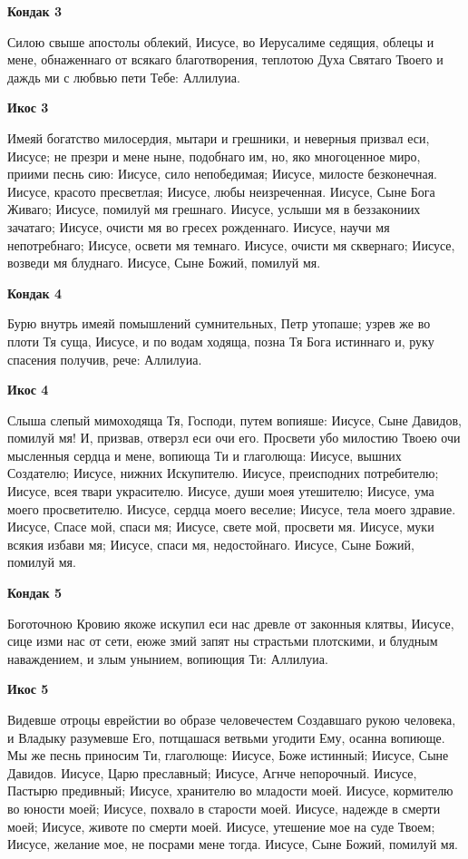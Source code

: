 \medskip
\bfseries Кондак 3\normalfont{}\nopagebreak


Силою
свыше апостолы облекий, Иисусе, во Иерусалиме седящия, облецы и мене, обнаженнаго от всякаго благотворения, теплотою Духа Святаго Твоего и даждь ми с любвью пети Тебе: Аллилуиа.


\medskip
\bfseries Икос 3\normalfont{}\nopagebreak


Имеяй
богатство милосердия, мытари и грешники, и неверныя призвал еси, Иисусе; не презри и мене ныне, подобнаго им, но, яко многоценное миро, приими песнь сию: Иисусе, сило непобедимая; Иисусе, милосте
безконечная. Иисусе, красото пресветлая; Иисусе, любы неизреченная. Иисусе, Сыне Бога Живаго; Иисусе, помилуй мя грешнаго. Иисусе, услыши мя в беззакониих зачатаго; Иисусе, очисти мя во гресех рожденнаго. Иисусе, научи мя непотребнаго; Иисусе, освети мя темнаго. Иисусе, очисти мя сквернаго; Иисусе, возведи мя блуднаго. Иисусе, Сыне Божий, помилуй мя.


\medskip
\bfseries Кондак 4\normalfont{}\nopagebreak


Бурю
внутрь имеяй помышлений сумнительных, Петр утопаше; узрев же во плоти Тя суща, Иисусе, и по водам ходяща, позна Тя Бога истиннаго и, руку спасения получив, рече: Аллилуиа. 


\medskip
\bfseries Икос 4\normalfont{}\nopagebreak


Слыша
слепый мимоходяща Тя, Господи, путем вопияше: Иисусе, Сыне Давидов, помилуй мя! И, призвав, отверзл еси очи его. Просвети убо милостию Твоею очи мысленныя сердца и мене, вопиюща Ти и глаголюща: Иисусе, вышних Создателю; Иисусе, нижних Искупителю. Иисусе, преисподних потребителю; Иисусе, всея твари украсителю. Иисусе, души моея утешителю; Иисусе, ума моего просветителю. Иисусе, сердца моего веселие; Иисусе, тела моего здравие. Иисусе, Спасе мой, спаси мя; Иисусе, свете мой, просвети мя. Иисусе, муки всякия избави мя; Иисусе, спаси мя, недостойнаго. Иисусе, Сыне Божий, помилуй мя.


\medskip
\bfseries Кондак 5\normalfont{}\nopagebreak


Боготочною
Кровию якоже искупил еси нас древле от законныя клятвы, Иисусе, сице изми нас от сети, еюже змий запят ны страстьми плотскими, и блудным наваждением, и злым унынием, вопиющия Ти: Аллилуиа.


\medskip
\bfseries Икос 5\normalfont{}\nopagebreak


Видевше
отроцы еврейстии во образе человечестем Создавшаго рукою человека, и Владыку разумевше Его, потщашася ветвьми угодити Ему, осанна вопиюще. Мы же песнь приносим Ти, глаголюще: Иисусе, Боже истинный; Иисусе, Сыне Давидов. Иисусе, Царю преславный; Иисусе, Агнче непорочный. Иисусе, Пастырю предивный; Иисусе, хранителю во младости моей. Иисусе, кормителю во юности моей; Иисусе, похвало в старости моей. Иисусе, надежде в смерти моей; Иисусе, животе по смерти моей. Иисусе, утешение мое на суде Твоем; Иисусе, желание мое, не посрами мене тогда. Иисусе, Сыне Божий, помилуй мя.


